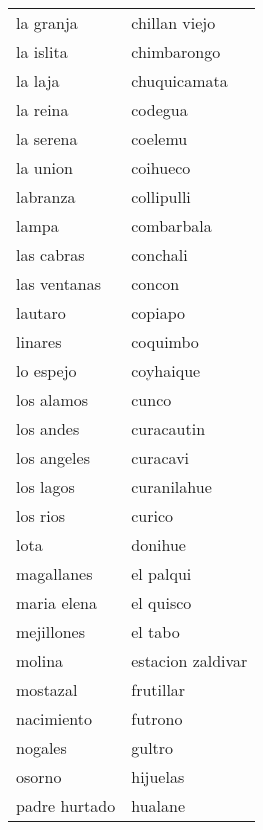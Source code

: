\begin{longtable}{l|l}
                   la granja   &    chillan viejo   \\   
                   la islita   &    chimbarongo   \\   
                   la laja   &    chuquicamata   \\   
                   la reina   &    codegua   \\   
                   la serena   &    coelemu   \\   
                   la union   &    coihueco   \\   
                   labranza   &    collipulli   \\   
                   lampa   &    combarbala   \\   
                   las cabras   &    conchali   \\   
                   las ventanas   &    concon   \\   
                   lautaro   &    copiapo   \\   
                   linares   &    coquimbo   \\   
                   lo espejo   &    coyhaique   \\   
                   los alamos   &    cunco   \\   
                   los andes   &    curacautin   \\   
                   los angeles   &    curacavi   \\   
                   los lagos   &    curanilahue   \\   
                   los rios   &    curico   \\   
                   lota   &    donihue   \\   
                   magallanes   &    el palqui   \\   
                   maria elena   &    el quisco   \\   
                   mejillones   &    el tabo   \\   
                   molina   &    estacion zaldivar   \\   
                   mostazal   &    frutillar   \\   
                   nacimiento   &    futrono   \\   
                   nogales   &    gultro   \\   
                   osorno   &    hijuelas   \\   
                   padre hurtado   &    hualane   \\   

\end{longtable}

